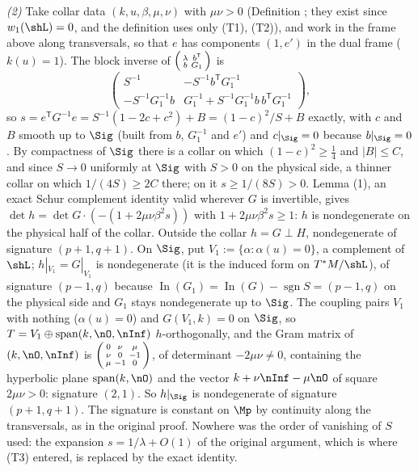 \emph{(2)} Take collar data $(k, u, \beta, \mu, \nu)$ with $\mu\nu > 0$ (Definition ; they exist since $w_1(\shL) = 0$, and the definition uses only (T1), (T2)), and work in the frame above along transversals, so that $e$ has components $(1, e')$ in the dual frame ($k(u) = 1$). The block inverse of $\begin{psmallmatrix} \lambda & b^{\mathsf T} \\ b & G_1\end{psmallmatrix}$ is
\[
\begin{pmatrix} S^{-1} & -S^{-1} b^{\mathsf T} G_1^{-1} \\ -S^{-1} G_1^{-1} b & G_1^{-1} + S^{-1} G_1^{-1} b\, b^{\mathsf T} G_1^{-1} \end{pmatrix},
\]
so $s = e^{\mathsf T} G^{-1} e = S^{-1}(1 - 2c + c^2) + B = (1-c)^2/S + B$ exactly, with $c$ and $B$ smooth up to $\Sig$ (built from $b$, $G_1^{-1}$ and $e'$) and $c|_\Sig = 0$ because $b|_\Sig = 0$. By compactness of $\Sig$ there is a collar on which $(1-c)^2 \geq \tfrac14$ and $|B| \leq C$, and since $S \to 0$ uniformly at $\Sig$ with $S > 0$ on the physical side, a thinner collar on which $1/(4S) \geq 2C$ there; on it $s \geq 1/(8S) > 0$. Lemma (1), an exact Schur complement identity valid wherever $G$ is invertible, gives $\det h = \det G \cdot (-(1 + 2\mu\nu\beta^2 s))$ with $1 + 2\mu\nu\beta^2 s \geq 1$: $h$ is nondegenerate on the physical half of the collar. Outside the collar $h = G \perp H$, nondegenerate of signature $(p{+}1, q{+}1)$. On $\Sig$, put $V_1 := \{\alpha : \alpha(u) = 0\}$, a complement of $\shL$; $h|_{V_1} = G|_{V_1}$ is nondegenerate (it is the induced form on $T^*M/\shL$), of signature $(p{-}1,q)$ because $\operatorname{In}(G_1) = \operatorname{In}(G) - \operatorname{sgn} S = (p{-}1,q)$ on the physical side and $G_1$ stays nondegenerate up to $\Sig$. The coupling pairs $V_1$ with nothing ($\alpha(u) = 0$) and $G(V_1, k) = 0$ on $\Sig$, so $T = V_1 \oplus \operatorname{span}(k, \nO, \nInf)$ $h$-orthogonally, and the Gram matrix of $(k, \nO, \nInf)$ is $\begin{psmallmatrix} 0 & \nu & \mu \\ \nu & 0 & -1 \\ \mu & -1 & 0\end{psmallmatrix}$, of determinant $-2\mu\nu \neq 0$, containing the hyperbolic plane $\operatorname{span}(k, \nO)$ and the vector $k + \nu\nInf - \mu\nO$ of square $2\mu\nu > 0$: signature $(2,1)$. So $h|_\Sig$ is nondegenerate of signature $(p{+}1, q{+}1)$. The signature is constant on $\Mp$ by continuity along the transversals, as in the original proof. Nowhere was the order of vanishing of $S$ used: the expansion $s = 1/\lambda + O(1)$ of the original argument, which is where (T3) entered, is replaced by the exact identity.

